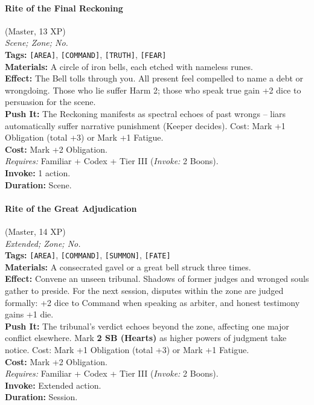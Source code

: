 \paragraph{Rite of the Final Reckoning} (Master, 13 XP) \hfill \\
\emph{Scene; Zone; No.} \\
\textbf{Tags:} \texttt{[AREA]}, \texttt{[COMMAND]}, \texttt{[TRUTH]}, \texttt{[FEAR]} \\
\textbf{Materials:} A circle of iron bells, each etched with nameless runes. \\
\textbf{Effect:} The Bell tolls through you. All present feel compelled to name a debt or wrongdoing. Those who lie suffer Harm 2; those who speak true gain +2 dice to persuasion for the scene. \\
\textbf{Push It:} The Reckoning manifests as spectral echoes of past wrongs -- liars automatically suffer narrative punishment (Keeper decides). Cost: Mark +1 Obligation (total +3) or Mark +1 Fatigue. \\
\textbf{Cost:} Mark +2 Obligation. \\
\textit{Requires:} Familiar + Codex + Tier III (\textit{Invoke:} 2 Boons). \\
\textbf{Invoke:} 1 action. \\
\textbf{Duration:} Scene.

\paragraph{Rite of the Great Adjudication} (Master, 14 XP) \hfill \\
\emph{Extended; Zone; No.} \\
\textbf{Tags:} \texttt{[AREA]}, \texttt{[COMMAND]}, \texttt{[SUMMON]}, \texttt{[FATE]} \\
\textbf{Materials:} A consecrated gavel or a great bell struck three times. \\
\textbf{Effect:} Convene an unseen tribunal. Shadows of former judges and wronged souls gather to preside. For the next session, disputes within the zone are judged formally: +2 dice to Command when speaking as arbiter, and honest testimony gains +1 die. \\
\textbf{Push It:} The tribunal's verdict echoes beyond the zone, affecting one major conflict elsewhere. Mark \textbf{2 SB (Hearts)} as higher powers of judgment take notice. Cost: Mark +1 Obligation (total +3) or Mark +1 Fatigue. \\
\textbf{Cost:} Mark +2 Obligation. \\
\textit{Requires:} Familiar + Codex + Tier III (\textit{Invoke:} 2 Boons). \\
\textbf{Invoke:} Extended action. \\
\textbf{Duration:} Session.


